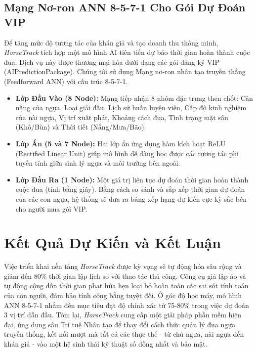 \documentclass{llncs}
\begin{document}
\subsection{Mạng Nơ-ron ANN 8-5-7-1 Cho Gói Dự Đoán VIP}
Để tăng mức độ tương tác của khán giả và tạo doanh thu thông minh, \textit{HorseTrack} tích hợp một mô hình AI tiên tiến dự báo thời gian hoàn thành cuộc đua. Dịch vụ này được thương mại hóa dưới dạng các gói đăng ký VIP (AIPredictionPackage). Chúng tôi sử dụng Mạng nơ-ron nhân tạo truyền thẳng (Feedforward ANN) với cấu trúc 8-5-7-1.
\begin{itemize}
    \item \textbf{Lớp Đầu Vào (8 Node):} Mạng tiếp nhận 8 nhóm đặc trưng then chốt: Cân nặng của ngựa, Loại giải đấu, Lịch sử huấn luyện viên, Cấp độ kinh nghiệm của nài ngựa, Vị trí xuất phát, Khoảng cách đua, Tình trạng mặt sân (Khô/Bùn) và Thời tiết (Nắng/Mưa/Bão).
    \item \textbf{Lớp Ẩn (5 và 7 Node):} Hai lớp ẩn ứng dụng hàm kích hoạt ReLU (Rectified Linear Unit) giúp mô hình dễ dàng học được các tương tác phi tuyến tính giữa sinh lý ngựa và môi trường bên ngoài.
    \item \textbf{Lớp Đầu Ra (1 Node):} Một giá trị liên tục dự đoán thời gian hoàn thành cuộc đua (tính bằng giây). Bằng cách so sánh và sắp xếp thời gian dự đoán của các con ngựa, hệ thống sẽ đưa ra bảng xếp hạng dự kiến cực kỳ sắc bén cho người mua gói VIP.
\end{itemize}

\section{Kết Quả Dự Kiến và Kết Luận}
Việc triển khai nền tảng \textit{HorseTrack} được kỳ vọng sẽ tự động hóa sâu rộng và giảm đến 80\% thời gian lập lịch so với thao tác thủ công. Công cụ giả lập ảo và tự động cộng dồn thời gian phạt hứa hẹn loại bỏ hoàn toàn các sai sót tính toán của con người, đảm bảo tính công bằng tuyệt đối. Ở góc độ học máy, mô hình ANN 8-5-7-1 nhắm đến mục tiêu đạt độ chính xác từ 75-80\% trong việc dự đoán 3 vị trí dẫn đầu. Tóm lại, \textit{HorseTrack} cung cấp một giải pháp phần mềm hiện đại, ứng dụng sâu Trí tuệ Nhân tạo để thay đổi cách thức quản lý đua ngựa truyền thống, kết nối mượt mà tất cả các thực thể - từ chủ ngựa, nài ngựa đến khán giả - vào một hệ sinh thái kỹ thuật số đồng nhất và bảo mật.
\end{document}
